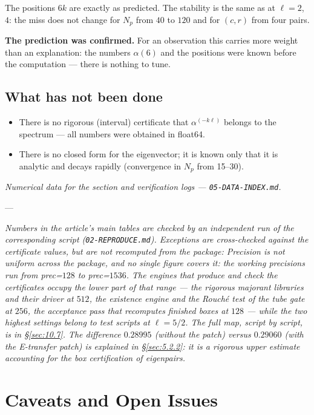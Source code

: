 The positions $6k$ are exactly as predicted. The stability is the
same as at $\ell = 2$, $4$: the miss does not change for $N_{p}$ from $40$ to
$120$ and for $(c, r)$ from four pairs.

\textbf{The prediction was confirmed.} For an observation this carries
more weight than an explanation: the numbers $\alpha(6)$ and the positions
were known before the computation --- there is nothing to tune.


\subsection{What has not been done}
\label{sec:8.6}

\begin{itemize}
\item There is no rigorous (interval) certificate that $\alpha^{(-k\ell)}$ belongs
  to the spectrum --- all numbers were obtained in float64.
\item There is no closed form for the eigenvector; it is known only that
  it is analytic and decays rapidly (convergence in $N_{p}$ from
  15--30).
\end{itemize}

\emph{Numerical data for the section and verification logs ---
\texttt{05-\allowbreak DATA-\allowbreak INDEX.md}.}

---

\emph{Numbers in the article's main tables are checked by an independent
run of the corresponding script (\texttt{02-\allowbreak REPRODUCE.md}). Exceptions are
cross-checked against the
certificate values, but are not recomputed from the package:
\notrecomputedroll{}
Precision is not uniform across the package, and no single figure covers it:
the working precisions run from prec=$128$ to prec=$1536$. The engines that
produce and check the certificates occupy the lower part of that range --- the
rigorous majorant libraries and their driver at $512$, the existence engine and
the Rouch\'e test of the tube gate at $256$, the
acceptance pass that recomputes finished boxes at $128$ --- while the two
highest settings belong to test scripts at $\ell = 5/2$. The full map,
script by script, is in \S\ref{sec:10.7}.
The difference $0.28995$ (without the patch) versus $0.29060$ (with the
E-transfer patch) is explained in \S\ref{sec:5.2.2}: it is a rigorous upper
estimate accounting for the box certification of eigenpairs.}



\section{Caveats and Open Issues}
\label{sec:9}

